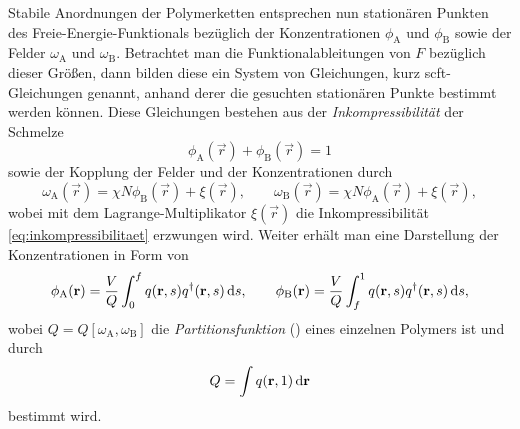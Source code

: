 \documentclass[../main.tex]{subfiles}
\begin{document}
Stabile Anordnungen der Polymerketten entsprechen nun stationären Punkten des Freie-Energie-Funktionals bezüglich der Konzentrationen $\phi_{\mathrm{A}}$ und $\phi_{\mathrm{B}}$ sowie der Felder $\omega_{\mathrm{A}}$ und $\omega_{\mathrm{B}}$.
Betrachtet man die Funktionalableitungen von $F$ bezüglich dieser Größen, dann bilden diese ein System von Gleichungen, kurz \ac{scft}-Gleichungen genannt, anhand derer die gesuchten stationären Punkte bestimmt werden können.
Diese Gleichungen bestehen aus der \emph{Inkompressibilität} der Schmelze
\begin{equation}
\label{eq:inkompressibilitaet}
    \phi_{\mathrm{A}}(\vec{r}) + \phi_{\mathrm{B}}(\vec{r}) = 1
\end{equation}%
sowie der Kopplung der Felder und der Konzentrationen durch
\begin{equation}
\label{eq:felder}
    \omega_{\mathrm{A}}(\vec{r}) = \chi N \phi_{\mathrm{B}}(\vec{r}) + \xi(\vec{r}), \qquad
    \omega_{\mathrm{B}}(\vec{r}) = \chi N \phi_{\mathrm{A}}(\vec{r}) + \xi(\vec{r}),
\end{equation}%
wobei mit dem Lagrange-Multiplikator $\xi(\vec{r})$ die Inkompressibilität \cref{eq:inkompressibilitaet} erzwungen wird.
Weiter erhält man eine Darstellung der Konzentrationen in Form von
\begin{equation}
\label{eq:konzentrationen}
    \phi_{\mathrm{A}}(\mathbf{r}) = \frac{V}{Q} \int_{0}^{f} q(\mathbf{r}, s) q^{\dagger}(\mathbf{r}, s) \mathop{}\!\mathrm{d} s, \qquad
    \phi_{\mathrm{B}}(\mathbf{r}) = \frac{V}{Q} \int_{f}^{1} q(\mathbf{r}, s) q^{\dagger}(\mathbf{r}, s) \mathop{}\!\mathrm{d} s,
\end{equation}%
wobei $Q = Q[\omega_{\mathrm{A}}, \omega_{\mathrm{B}}]$ die \emph{Partitionsfunktion} () eines einzelnen Polymers ist und durch
\begin{equation}
\label{eq:partitionsfunktion}
    Q = \int q(\mathbf{r}, 1) \mathop{}\!\mathrm{d} \mathbf{r}
\end{equation}%
bestimmt wird.
\end{document}
